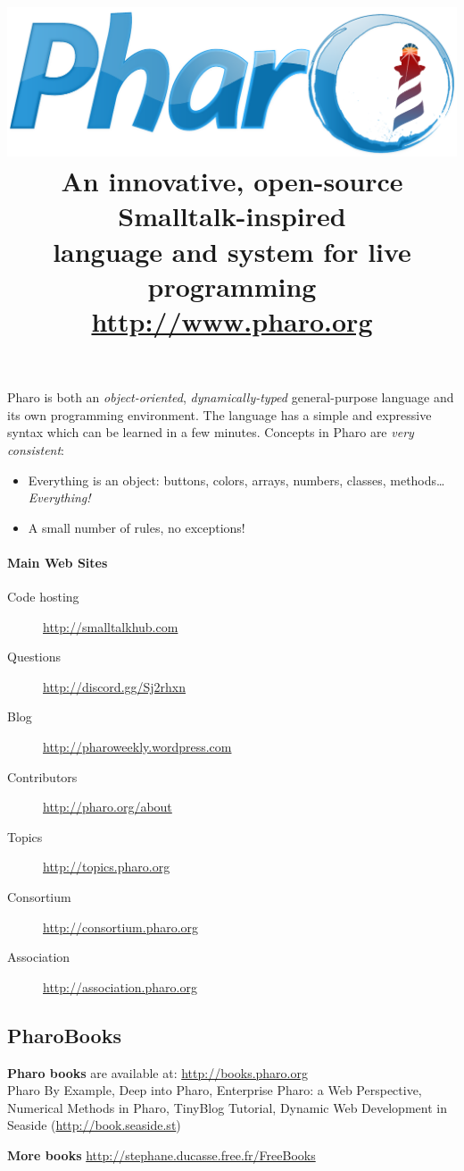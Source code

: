\documentclass[notumble]{leaflet}
\title{\vspace{-1.0cm}\normalfont
\includegraphics[width=0.8\linewidth]{logo.pdf}
\\[1.2\baselineskip]%
\vspace{-0.8cm}
\fontseries{cl}\selectfont\LARGE
An innovative, open-source Smalltalk-inspired \\ language and system for live programming\\
\url{http://www.pharo.org}}
\date{}
\begin{document}
\maketitle
\thispagestyle{empty}
\vspace{-1.7cm}
Pharo is both an \emph{object-oriented}, \emph{dynamically-typed}
general-purpose language and its own programming environment. The
language has a simple and expressive syntax which can be learned
in a few minutes. Concepts in Pharo are \emph{very consistent}:
\begin{itemize}
  \item Everything is an object: buttons, colors, arrays, numbers, classes, methods\ldots \emph{Everything!}
  \item A small number of rules, no exceptions!
\end{itemize}

\vspace{-0.3cm}
\paragraph{Main Web Sites}
\begin{description}
 \item[Code hosting] \url{http://smalltalkhub.com}
 \item[Questions]    \url{http://discord.gg/Sj2rhxn}
 \item[Blog] \url{http://pharoweekly.wordpress.com}
 \item[Contributors] \url{http://pharo.org/about}
 \item[Topics]       \url{http://topics.pharo.org}
 \item[Consortium]   \url{http://consortium.pharo.org}
 \item[Association]  \url{http://association.pharo.org}
\end{description}

\vspace{-0.3cm}
\subsection{PharoBooks}

\textbf{Pharo books} are available at: \url{http://books.pharo.org}\\
Pharo By Example, Deep into Pharo, Enterprise Pharo: a Web Perspective,
Numerical Methods in Pharo, TinyBlog Tutorial, Dynamic Web Development in Seaside 
(\url{http://book.seaside.st})

\textbf{More books} \url{http://stephane.ducasse.free.fr/FreeBooks}
\end{document}
